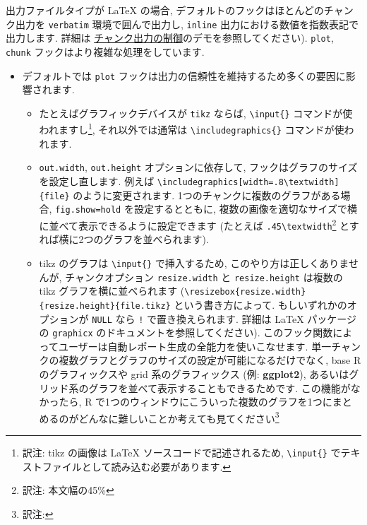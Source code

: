 \documentclass[
  lualatex,ja=standard,jafont=noto-otf]{bxjsreport}
\providecommand{\tightlist}{%
  \setlength{\itemsep}{0pt}\setlength{\parskip}{0pt}}
\begin{document}
出力ファイルタイプが LaTeX の場合,
デフォルトのフックはほとんどのチャンク出力を \texttt{verbatim}
環境で囲んで出力し, \texttt{inline}
出力における数値を指数表記で出力します. 詳細は
\protect\hyperlink{output}{チャンク出力の制御}のデモを参照してください).
\texttt{plot}, \texttt{chunk} フックはより複雑な処理をしています.

\begin{itemize}
\tightlist
\item
  デフォルトでは \texttt{plot}
  フックは出力の信頼性を維持するため多くの要因に影響されます.

  \begin{itemize}
  \tightlist
  \item
    たとえばグラフィックデバイスが \texttt{tikz} ならば,
    \texttt{\textbackslash{}input\{\}}
    コマンドが使われますし\footnote{訳注: tikz の画像は LaTeX
      ソースコードで記述されるため, \texttt{\textbackslash{}input\{\}}
      でテキストファイルとして読み込む必要があります.},
    それ以外では通常は \texttt{\textbackslash{}includegraphics\{\}}
    コマンドが使われます.
  \item
    \texttt{out.width}, \texttt{out.height} オプションに依存して,
    フックはグラフのサイズを設定し直します. 例えば
    \texttt{\textbackslash{}includegraphics{[}width=.8\textbackslash{}textwidth{]}\{file\}}
    のように変更されます. 1つのチャンクに複数のグラフがある場合,
    \texttt{fig.show=\textquotesingle{}hold\textquotesingle{}}
    を設定するとともに,
    複数の画像を適切なサイズで横に並べて表示できるように設定できます
    (たとえば \texttt{.45\textbackslash{}textwidth}\footnote{訳注:
      本文幅の45\%} とすれば横に2つのグラフを並べられます).
  \item
    tikz のグラフは \texttt{\textbackslash{}input\{\}} で挿入するため,
    このやり方は正しくありませんが, チャンクオプション
    \texttt{resize.width} と \texttt{resize.height} は複数の tikz
    グラフを横に並べられます
    (\texttt{\textbackslash{}resizebox\{resize.width\}\{resize.height\}\{file.tikz\}}
    という書き方によって. もしいずれかのオプションが \texttt{NULL} なら
    \texttt{!} で置き換えられます. 詳細は LaTeX パッケージの
    \texttt{graphicx} のドキュメントを参照してください).
    このフック関数によってユーザーは自動レポート生成の全能力を使いこなせます.
    単一チャンクの複数グラフとグラフのサイズの設定が可能になるだけでなく,
    base R のグラフィックスや grid 系のグラフィックス (例:
    \textbf{ggplot2}),
    あるいはグリッド系のグラフを並べて表示することもできるためです.
    この機能がなかったら, R
    で1つのウィンドウにこういった複数のグラフを1つにまとめるのがどんなに難しいことか考えても見てください\footnote{訳注:
}
\end{itemize}
\end{itemize}
\end{document}
